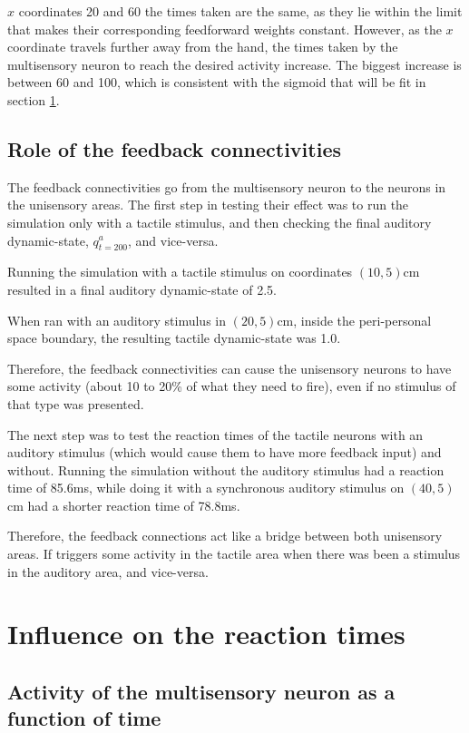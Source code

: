 \documentclass[12pt]{article}
\begin{document}
$x$ coordinates 20 and 60 the times taken are the same, as they lie within the limit that makes their corresponding feedforward weights constant. However, as the $x$ coordinate travels further away from the hand, the times taken by the multisensory neuron to reach the desired activity increase. The biggest increase is between 60 and 100, which is consistent with the sigmoid that will be fit in section \ref{sec:4}.

\subsection{Role of the feedback connectivities}

The feedback connectivities go from the multisensory neuron to the neurons in the unisensory areas. The first step in testing their effect was to run the simulation only with a tactile stimulus, and then checking the final auditory dynamic-state, $q_{t=200}^a$, and vice-versa.

Running the simulation with a tactile stimulus on coordinates $(10, 5)$cm resulted in a final auditory dynamic-state of 2.5.

When ran with an auditory stimulus in $(20, 5)$cm, inside the peri-personal space boundary, the resulting tactile dynamic-state was 1.0.

Therefore, the feedback connectivities can cause the unisensory neurons to have some activity (about 10 to 20\% of what they need to fire), even if no stimulus of that type was presented.

The next step was to test the reaction times of the tactile neurons with an auditory stimulus (which would cause them to have more feedback input) and without. Running the simulation without the auditory stimulus had a reaction time of 85.6ms, while doing it with a synchronous auditory stimulus on $(40, 5)$cm had a shorter reaction time of 78.8ms.

Therefore, the feedback connections act like a bridge between both unisensory areas. If triggers some activity in the tactile area when there was been a stimulus in the auditory area, and vice-versa.

\section{Influence on the reaction times}
\label{sec:4}

\subsection{Activity of the multisensory neuron as a function of time}
\end{document}
